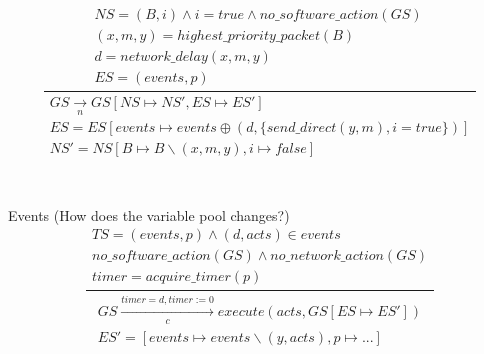 \documentclass[]{article}
\begin{document}
\begin{equation}
\frac
{
	\begin{gathered}
	NS = (B,i) \wedge i = true \wedge  no\_software\_action(GS) \ \\
	(x,m,y) = highest\_priority\_packet(B) \\ 
	d = network\_delay(x,m,y)  \\ ES = (events,p)
	\end{gathered}
}
{
	\begin{gathered}
	GS\xrightarrow[n]{}GS[NS\longmapsto NS',ES\longmapsto ES']  \\
	ES= ES[events \longmapsto events\oplus (d,\{send\_direct(y,m), i = true\})]  \\
	 NS'= NS[B \longmapsto B\backslash(x,m,y), i \longmapsto false ] \\
	\end{gathered}
}
\end{equation}
\\\\
Events
(How does the variable pool changes?)
\begin{equation}
\frac
{
	\begin{gathered}
	TS= (events,p) \wedge (d,acts) \in events  \\
	no\_software\_action(GS) \wedge no\_network\_action(GS) \\
	timer = acquire\_timer(p)
	\end{gathered}
}
{
	\begin{gathered}
	GS\xrightarrow[c]{timer = d, timer:=0} execute(acts,GS[ES\longmapsto ES']) \\
	ES'= [events \longmapsto events \backslash (y,acts), p\longmapsto ... ]
	\end{gathered}
}
\end{equation}
\end{document}
